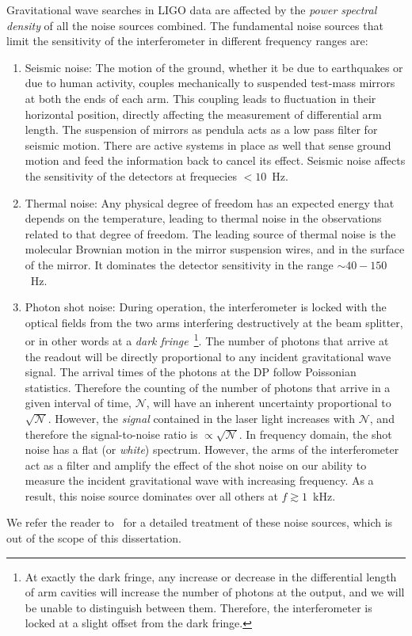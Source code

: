Gravitational wave searches in LIGO data are affected by the {\it power
spectral density} of all the noise sources combined. The fundamental noise 
sources that limit the sensitivity of the interferometer in different frequency
ranges are:
% 
\begin{enumerate}
 \item Seismic noise:
 The motion of the ground, whether it be due to earthquakes or due to human 
 activity, couples mechanically to suspended test-mass mirrors at both the ends
 of each arm. This coupling leads to fluctuation in their horizontal
 position, directly affecting the measurement of differential arm length.
 The suspension of mirrors as pendula acts as a low pass filter for seismic
 motion. There are active systems in place as well that sense ground motion and 
 feed the information back to cancel its effect. Seismic noise affects the 
 sensitivity of the detectors at frequecies  $< 10$~Hz.
 \item Thermal noise:
 Any physical degree of freedom has an expected energy that depends on the temperature,
 leading to thermal noise in the observations related to that degree of freedom.
 The leading source of thermal noise is the molecular Brownian motion in the
 mirror suspension wires, and in the surface of the mirror. 
 It dominates  the detector sensitivity in the range $\sim 40-150$~Hz.
 \item Photon shot noise:
 During operation, the interferometer is locked 
 with the optical fields from the two arms interfering destructively at the
 beam splitter, or in other words at a {\it dark fringe}~\footnote{At exactly the 
 dark fringe, any increase or decrease in the differential length of arm cavities
 will increase  the number of photons at the output, and we will be unable to 
 distinguish between them. Therefore, the interferometer is locked at a slight
 offset from the dark fringe.}. The number of photons
 that arrive at the readout will be directly proportional to any incident
 gravitational wave signal. The arrival times of the photons at the DP 
 follow Poissonian statistics. Therefore the counting of the number of
 photons that arrive in a given interval of time, $\mathcal{N}$, will have an 
 inherent uncertainty proportional to $\sqrt{\mathcal{N}}$. However, the {\it signal}
 contained in the laser light increases with $\mathcal{N}$, and therefore the 
 signal-to-noise ratio is $\propto \sqrt{\mathcal{N}}$.
 In frequency domain, the shot noise has a flat (or {\it white}) spectrum. 
 However, the arms of the interferometer act as a filter and amplify the effect
 of the shot noise on our ability to measure the incident gravitational wave
 with increasing frequency. As a result, this noise source dominates over all
 others at $f\gtrsim 1$~kHz.
\end{enumerate}
% 
We refer the reader to~\cite{Saulson:1995zi} for a detailed treatment of these
noise sources, which is out of the scope of this dissertation. 

